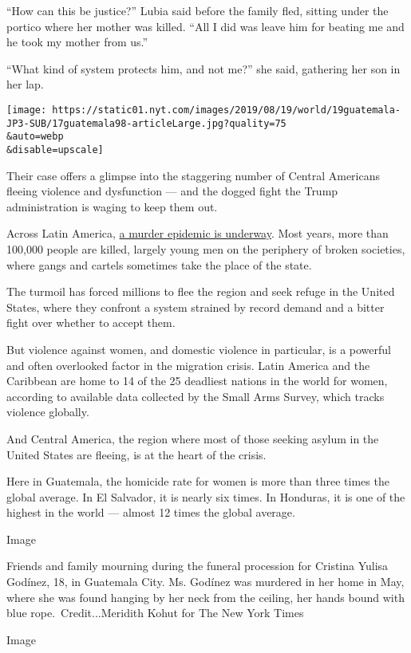``How can this be justice?'' Lubia said before the family fled, sitting
under the portico where her mother was killed. ``All I did was leave him
for beating me and he took my mother from us.''

``What kind of system protects him, and not me?'' she said, gathering
her son in her lap.

\texttt{[image: https://static01.nyt.com/images/2019/08/19/world/19guatemala-JP3-SUB/17guatemala98-articleLarge.jpg?quality=75\\\&auto=webp\\\&disable=upscale]}

Their case offers a glimpse into the staggering number of Central
Americans fleeing violence and dysfunction --- and the dogged fight the
Trump administration is waging to keep them out.

Across Latin America,
\href{https://www.nytimes.com/interactive/2019/05/04/world/americas/honduras-gang-violence.html}{a
murder epidemic is underway}. Most years, more than 100,000 people are
killed, largely young men on the periphery of broken societies, where
gangs and cartels sometimes take the place of the state.

The turmoil has forced millions to flee the region and seek refuge in
the United States, where they confront a system strained by record
demand and a bitter fight over whether to accept them.

But violence against women, and domestic violence in particular, is a
powerful and often overlooked factor in the migration crisis. Latin
America and the Caribbean are home to 14 of the 25 deadliest nations in
the world for women, according to available data collected by the Small
Arms Survey, which tracks violence globally.

And Central America, the region where most of those seeking asylum in
the United States are fleeing, is at the heart of the crisis.

Here in Guatemala, the homicide rate for women is more than three times
the global average. In El Salvador, it is nearly six times. In Honduras,
it is one of the highest in the world --- almost 12 times the global
average.

Image

Friends and family mourning during the funeral procession for Cristina
Yulisa Godínez, 18, in Guatemala City. Ms. Godínez was murdered in her
home in May, where she was found hanging by her neck from the ceiling,
her hands bound with blue rope.~Credit...Meridith Kohut for The New York
Times

Image

